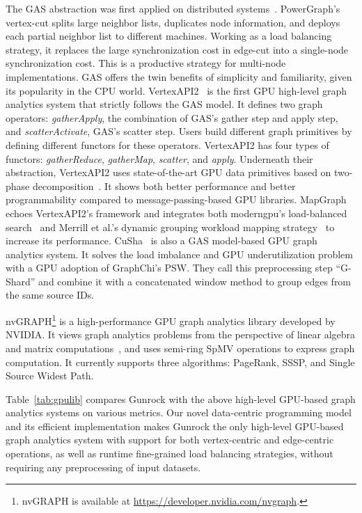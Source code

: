 \documentclass[format=acmsmall,review=false,screen=true]{acmart}
\begin{document}
The GAS abstraction was first applied on distributed
systems~\cite{Gonzalez:2012:PDG}. PowerGraph's vertex-cut splits large
neighbor lists, duplicates node information, and deploys each partial
neighbor list to different machines. Working as a load balancing
strategy, it replaces the large synchronization cost in edge-cut into
a single-node synchronization cost. This is a productive strategy for
multi-node implementations. GAS offers the twin benefits of simplicity
and familiarity, given its popularity in the CPU world.
VertexAPI2~\cite{Elsen:2013:AVC} is the first GPU high-level graph
analytics system that strictly follows the GAS model. It defines two
graph operators: \emph{gatherApply}, the combination of GAS's gather
step and apply step, and \emph{scatterActivate}, GAS's scatter step.
Users build different graph primitives by defining different functors
for these operators. VertexAPI2 has four types of functors:
\emph{gatherReduce}, \emph{gatherMap}, \emph{scatter}, and
\emph{apply}. Underneath their abstraction, VertexAPI2 uses
state-of-the-art GPU data primitives based on two-phase
decomposition~\cite{MGPU:2016}. It shows both better performance and
better programmability compared to message-passing-based GPU
libraries. MapGraph~\cite{Fu:2014:MAH} echoes VertexAPI2's framework
and integrates both moderngpu's load-balanced search~\cite{MGPU:2016}
and Merrill et al.'s dynamic grouping workload mapping
strategy~\cite{Merrill:2012:SGG} to increase its performance.
CuSha~\cite{Khorasani:2014:CVG} is also a GAS model-based GPU graph
analytics system. It solves the load imbalance and GPU
underutilization problem with a GPU adoption of GraphChi's PSW\@. They
call this preprocessing step ``G-Shard'' and combine it with a
concatenated window method to group edges from the same source IDs.

nvGRAPH\footnote{nvGRAPH is available at
  \url{https://developer.nvidia.com/nvgraph}.} is a high-performance
GPU graph analytics library developed by NVIDIA\@. It views graph
analytics problems from the perspective of linear algebra and matrix
computations~\cite{Kepner:2016:MFO}, and uses semi-ring SpMV
operations to express graph computation. It currently supports three
algorithms: PageRank, SSSP, and Single Source Widest Path.

Table~\ref{tab:gpulib} compares Gunrock with the above high-level
GPU-based graph analytics systems on various metrics. Our novel
data-centric programming model and its efficient implementation makes
Gunrock the only high-level GPU-based graph analytics system with
support for both vertex-centric and edge-centric operations, as well
as runtime fine-grained load balancing strategies, without requiring
any preprocessing of input datasets.
\end{document}
